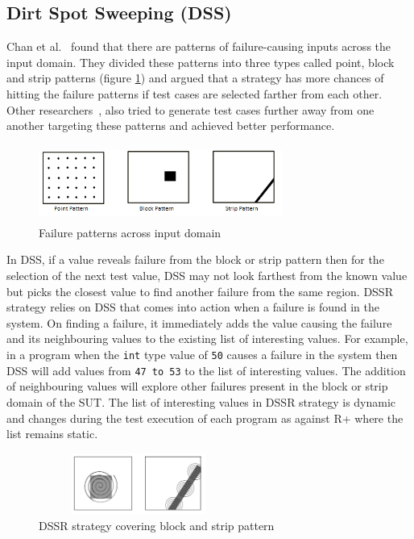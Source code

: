 \documentclass[conference]{IEEEtran}
\begin{document}
\subsection{Dirt Spot Sweeping (DSS)}
Chan et al.~\cite{Chan1996} found that there are patterns of failure-causing inputs across the input domain. They divided these patterns into three types called point, block and strip patterns (figure \ref{fig:patterns}) and argued that a strategy has more chances of hitting the failure patterns if test cases are selected farther from each other. Other researchers~\cite{Chan2002, Chen2003, Chen2005}, also tried to generate test cases further away from one another targeting these patterns and achieved better performance. %
\begin{figure}[ht]                                    
\centering
\includegraphics[width= 8cm,height=2.5cm]{ART_Patterns.png}
\caption{Failure patterns across input domain~\cite{Chen2008}}
\label{fig:patterns}
\end{figure}
In DSS, if a value reveals failure from the block or strip pattern then for the selection of the next test value, DSS may not look farthest from the known value but picks the closest value to find another failure from the same region. DSSR strategy relies on DSS that comes into action when a failure is found in the system. On finding a failure, it immediately adds the value causing the failure and its neighbouring values to the existing list of interesting values. For example, in a program when the \verb+int+ type value of \verb+50+ causes a failure in the system then DSS will add values from \verb+47 to 53+ to the list of interesting values. The addition of neighbouring values will explore other failures present in the block or strip domain of the SUT. The list of interesting values in DSSR strategy is dynamic and changes during the test execution of each program as against R+ where the list remains static.

\begin{figure}[ht]
\centering
\includegraphics[width=6.6cm,height=2cm]{block2.png}
\caption{DSSR strategy covering block and strip pattern}
\label{fig:block2}
\end{figure}
\end{document}

